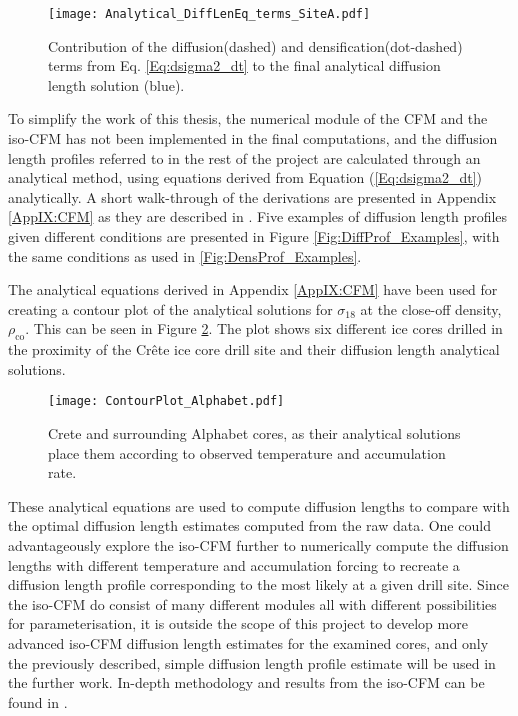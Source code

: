 \documentclass[../../CompleteThesis2/Complete_2ndDraft]{subfiles}
\begin{document}
\begin{figure}
	\centering
	\texttt{[image: Analytical\_DiffLenEq\_terms\_SiteA.pdf]}
	\caption[Rate terms in the diffusion equation]{\small Contribution of the diffusion(dashed) and densification(dot-dashed) terms from Eq. \ref{Eq:dsigma2_dt} to the final analytical diffusion length solution (blue).}
	\label{Fig:ICE_DiffDensTerms}
\end{figure}

To simplify the work of this thesis, the numerical module of the CFM and the iso-CFM has not been implemented in the final computations, and the diffusion length profiles referred to in the rest of the project are calculated through an analytical method, using equations derived from Equation (\ref{Eq:dsigma2_dt}) analytically. A short walk-through of the derivations are presented in Appendix \ref{AppIX:CFM} as they are described in \cite[Gkinis et al., 2021]{Gkinis2021}. Five examples of diffusion length profiles given different conditions are presented in Figure \ref{Fig:DiffProf_Examples}, with the same conditions as used in \ref{Fig:DensProf_Examples}.

The analytical equations derived in Appendix \ref{AppIX:CFM} have been used for creating a contour plot of the analytical solutions for $\sigma_{18}$ at the close-off density, $\rho_{\text{co}}$. This can be seen in Figure \ref{Fig:ICE_ContourPlot}. The plot shows six different ice cores drilled in the proximity of the Crête ice core drill site and their diffusion length analytical solutions.

\begin{figure}
	\centering
	\texttt{[image: ContourPlot\_Alphabet.pdf]}
	\caption[Analytical solutions of diffusion length, Alphabet cores]{\small Crete and surrounding Alphabet cores, as their analytical solutions place them according to observed temperature and accumulation rate.}
	\label{Fig:ICE_ContourPlot}
\end{figure}


These analytical equations are used to compute diffusion lengths to compare with the optimal diffusion length estimates computed from the raw data. One could advantageously explore the iso-CFM further to numerically compute the diffusion lengths with different temperature and accumulation forcing to recreate a diffusion length profile corresponding to the most likely at a given drill site. Since the iso-CFM do consist of many different modules all with different possibilities for parameterisation, it is outside the scope of this project to develop more advanced iso-CFM diffusion length estimates for the examined cores, and only the previously described, simple diffusion length profile estimate will be used in the further work. In-depth methodology and results from the iso-CFM can be found in \cite[Gkinis et al., 2021]{Gkinis2021}.
\end{document}
